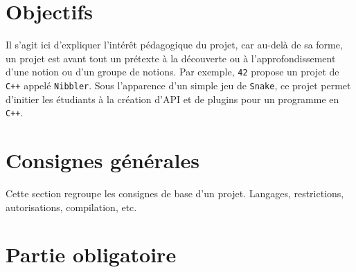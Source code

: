 \documentclass{42-fr}
\begin{document}
\chapter{Objectifs}

    Il s'agit ici d'expliquer l'int\'er\^et p\'edagogique du projet,
    car au-del\`a de sa forme, un projet est avant tout un
    pr\'etexte \`a la d\'ecouverte ou \`a l'approfondissement d'une
    notion ou d'un groupe de notions. Par exemple, \texttt{42} propose
    un projet de \texttt{C++} appel\'e \texttt{Nibbler}. Sous
    l'apparence d'un simple jeu de \texttt{Snake}, ce projet permet
    d'initier les \'etudiants \`a la cr\'eation d'API et de plugins
    pour un programme en \texttt{C++}.



\chapter{Consignes g\'en\'erales}

    Cette section regroupe les consignes de base d'un
    projet. Langages, restrictions, autorisations, compilation, etc.



\chapter{Partie obligatoire}
\end{document}
